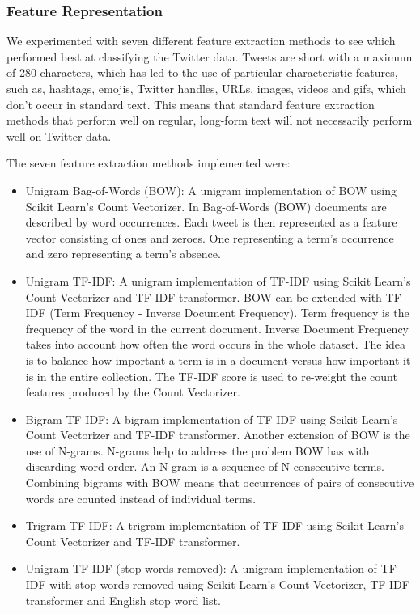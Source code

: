 \subsubsection{Feature Representation}

We experimented with seven different feature extraction methods to see which performed best at classifying the Twitter data. Tweets are short with a maximum of 280 characters, which has led to the use of particular characteristic features, such as, hashtags, emojis, Twitter handles, URLs, images, videos and gifs, which don't occur in standard text. This means that standard feature extraction methods that perform well on regular, long-form text will not necessarily perform well on Twitter data.

The seven feature extraction methods implemented were:
\begin{itemize}
    \item Unigram Bag-of-Words (BOW): A unigram implementation of BOW using Scikit Learn's Count Vectorizer. In Bag-of-Words (BOW) documents are described by word occurrences. Each tweet is then represented as a feature vector consisting of ones and zeroes. One representing a term's occurrence and zero representing a term's absence.
    \item Unigram TF-IDF: A unigram implementation of TF-IDF using Scikit Learn's Count Vectorizer and TF-IDF transformer. BOW can be extended with TF-IDF (Term Frequency - Inverse Document Frequency). Term frequency is the frequency of the word in the current document. Inverse Document Frequency takes into account how often the word occurs in the whole dataset. The idea is to balance how important a term is in a document versus how important it is in the entire collection. The TF-IDF score is used to re-weight the count features produced by the Count Vectorizer.
    \item Bigram TF-IDF: A bigram implementation of TF-IDF using Scikit Learn's Count Vectorizer and TF-IDF transformer. Another extension of BOW is the use of N-grams. N-grams help to address the problem BOW has with discarding word order. An N-gram is a sequence of N consecutive terms. Combining bigrams with BOW means that occurrences of pairs of consecutive words are counted instead of individual terms.
    \item Trigram TF-IDF: A trigram implementation of TF-IDF using Scikit Learn's Count Vectorizer and TF-IDF transformer.
    \item Unigram TF-IDF (stop words removed): A unigram implementation of TF-IDF with stop words removed using Scikit Learn's Count Vectorizer, TF-IDF transformer and English stop word list.

\end{itemize}
